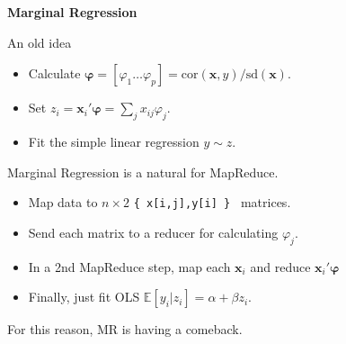 \documentclass[11pt,xcolor=svgnames]{beamer}
\newcommand{\theme}{\color{Maroon}}
\newcommand{\bs}[1]{\boldsymbol{#1}}
\newcommand{\mr}[1]{\mathrm{#1}}
\newcommand{\bm}[1]{\mathbf{#1}}
\newcommand{\ds}[1]{\mathds{#1}}
\newcommand{\sk}{\vspace{.5cm}}
\begin{document}
\begin{frame}

{\bf \theme Marginal Regression}

\sk
An old idea
\begin{itemize}
\item Calculate $\bs{\varphi} = [\varphi_1 \ldots \varphi_p] 
= \mr{cor}(\bm{x},y)/\mr{sd}(\bm{x})$.
\item Set $z_i = \bm{x}_i'\bs{\varphi} = \sum_{j} x_{ij}\varphi_j$.
\item Fit the simple linear regression $y \sim z$.
\end{itemize}

\sk
Marginal Regression is a natural for MapReduce.
\begin{itemize}
\item Map data to $n\times 2$ {\tt \{ x[i,j],y[i] \} } matrices.
\item Send each matrix to a reducer for calculating $\varphi_j$.
\item In a 2nd MapReduce step, 
map each $\bm{x}_i$ and reduce $\bm{x}_i'\bs{\varphi}$
\item Finally, just fit OLS $\ds{E}[y_i|z_i] = \alpha + \beta z_i$.
\end{itemize}
{ For this reason, MR is having a comeback.}

\end{frame}
\end{document}
